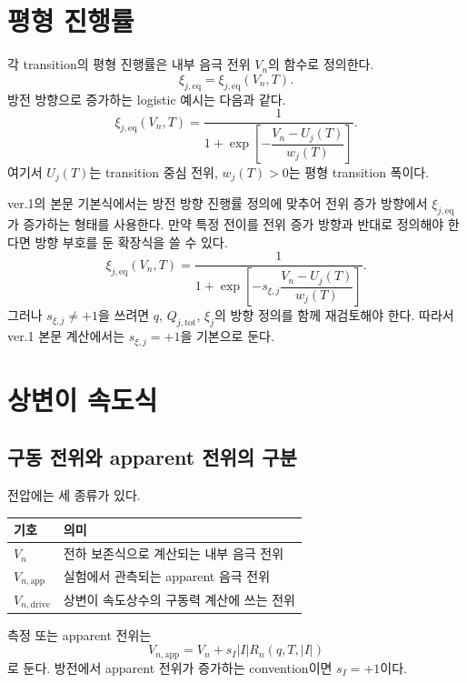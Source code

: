 \documentclass[11pt,a4paper]{article}
\newcommand{\app}{\mathrm{app}}
\newcommand{\drive}{\mathrm{drive}}
\newcommand{\tot}{\mathrm{tot}}
\begin{document}
\section{평형 진행률}
각 transition의 평형 진행률은 내부 음극 전위 \(V_n\)의 함수로 정의한다.
\begin{equation}
\xi_{j,\mathrm{eq}}=\xi_{j,\mathrm{eq}}(V_n,T).
\end{equation}
방전 방향으로 증가하는 logistic 예시는 다음과 같다.
\begin{equation}
\xi_{j,\mathrm{eq}}(V_n,T)=\frac{1}{1+\exp\left[-\dfrac{V_n-U_j(T)}{w_j(T)}\right]}.
\label{eq:xi_eq_logistic}
\end{equation}
여기서 \(U_j(T)\)는 transition 중심 전위, \(w_j(T)>0\)는 평형 transition 폭이다.

ver.1의 본문 기본식에서는 방전 방향 진행률 정의에 맞추어 전위 증가 방향에서 \(\xi_{j,\mathrm{eq}}\)가 증가하는 형태를 사용한다. 만약 특정 전이를 전위 증가 방향과 반대로 정의해야 한다면 방향 부호를 둔 확장식을 쓸 수 있다.
\begin{equation}
\xi_{j,\mathrm{eq}}(V_n,T)=\frac{1}{1+\exp\left[-s_{\xi,j}\dfrac{V_n-U_j(T)}{w_j(T)}\right]}.
\label{eq:xi_eq_signed}
\end{equation}
그러나 \(s_{\xi,j}\neq +1\)을 쓰려면 \(q\), \(Q_{j,\tot}\), \(\xi_j\)의 방향 정의를 함께 재검토해야 한다. 따라서 ver.1 본문 계산에서는 \(s_{\xi,j}=+1\)을 기본으로 둔다.

\section{상변이 속도식}
\subsection{구동 전위와 apparent 전위의 구분}
전압에는 세 종류가 있다.
\begin{longtable}{p{} p{}}
\toprule
기호 & 의미 \\
\midrule
\endhead
\(V_n\) & 전하 보존식으로 계산되는 내부 음극 전위 \\
\(V_{n,\app}\) & 실험에서 관측되는 apparent 음극 전위 \\
\(V_{n,\drive}\) & 상변이 속도상수의 구동력 계산에 쓰는 전위 \\
\bottomrule
\end{longtable}

측정 또는 apparent 전위는
\begin{equation}
V_{n,\app}=V_n+s_I|I|R_n(q,T,|I|)
\label{eq:Vapp_def}
\end{equation}
로 둔다. 방전에서 apparent 전위가 증가하는 convention이면 \(s_I=+1\)이다.
\end{document}
